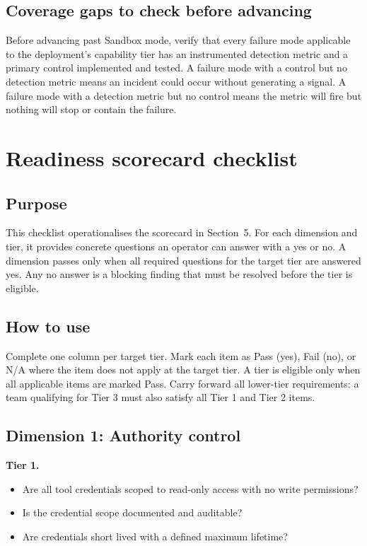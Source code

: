 \documentclass[11pt]{article}
\begin{document}
\subsection{Coverage gaps to check before advancing}
Before advancing past Sandbox mode, verify that every failure mode applicable to the deployment's capability tier has an instrumented detection metric and a primary control implemented and tested. A failure mode with a control but no detection metric means an incident could occur without generating a signal. A failure mode with a detection metric but no control means the metric will fire but nothing will stop or contain the failure.

\section{Readiness scorecard checklist}
\subsection{Purpose}
This checklist operationalises the scorecard in Section~5. For each dimension and tier, it provides concrete questions an operator can answer with a yes or no. A dimension passes only when all required questions for the target tier are answered yes. Any no answer is a blocking finding that must be resolved before the tier is eligible.

\subsection{How to use}
Complete one column per target tier. Mark each item as Pass (yes), Fail (no), or N/A where the item does not apply at the target tier. A tier is eligible only when all applicable items are marked Pass. Carry forward all lower-tier requirements: a team qualifying for Tier 3 must also satisfy all Tier 1 and Tier 2 items.

\subsection{Dimension 1: Authority control}

\textbf{Tier 1.}
\begin{itemize}
  \item Are all tool credentials scoped to read-only access with no write permissions?
  \item Is the credential scope documented and auditable?
  \item Are credentials short lived with a defined maximum lifetime?
\end{itemize}
\end{document}
